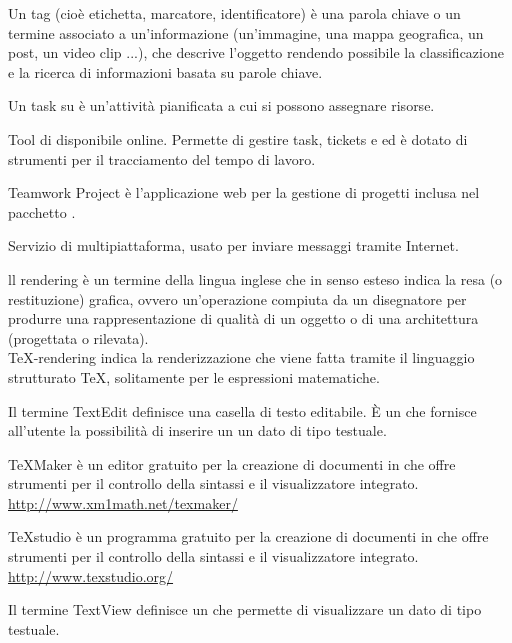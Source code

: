 Un tag (cioè etichetta, marcatore, identificatore) è una parola chiave o un termine associato a un'informazione (un'immagine, una mappa geografica, un post, un video clip ...), che descrive l'oggetto rendendo possibile la classificazione e la ricerca di informazioni basata su parole chiave.

Un task su  è un’attività pianificata a cui si possono assegnare risorse.

Tool di  disponibile online. Permette di gestire  task, tickets e  ed è dotato di strumenti per il tracciamento del tempo di lavoro.

Teamwork Project è l’applicazione web per la gestione di progetti inclusa nel pacchetto .

Servizio di  multipiattaforma, usato per inviare messaggi tramite Internet.

ll rendering è un termine della lingua inglese che in senso esteso indica la resa (o restituzione) grafica, ovvero un'operazione compiuta da un disegnatore per produrre una rappresentazione di qualità di un oggetto o di una architettura (progettata o rilevata).\\
\TeX -rendering indica la renderizzazione che viene fatta tramite il linguaggio strutturato \TeX, solitamente per le espressioni matematiche.

Il termine TextEdit definisce una casella di testo editabile. È un  che fornisce all’utente la possibilità di inserire un un dato di tipo testuale.

TeXMaker è un editor gratuito per la creazione di documenti in \glossario{\LaTeX} che offre strumenti per il controllo della sintassi e il visualizzatore integrato.\\
\url{http://www.xm1math.net/texmaker/}

TeXstudio è un programma gratuito per la creazione di documenti in \glossario{\LaTeX} che offre strumenti per il controllo della sintassi e il visualizzatore integrato.\\
\url{http://www.texstudio.org/}

Il termine TextView definisce un  che permette di visualizzare un dato di tipo testuale.

